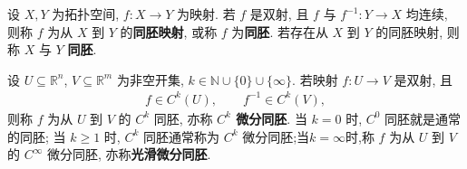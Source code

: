\documentclass[../../main.tex]{subfiles}%
\begin{document}
\begin{definition}[同胚]
设 \(X,Y\) 为拓扑空间, \(f:X\to Y\) 为映射. 若 \(f\) 是双射, 且 \(f\) 与 \(f^{-1}:Y\to X\) 均连续, 则称 \(f\) 为从 \(X\) 到 \(Y\) 的\textbf{同胚映射}, 或称 \(f\) 为\textbf{同胚}. 若存在从 \(X\) 到 \(Y\) 的同胚映射, 则称 \(X\) 与 \(Y\) \textbf{同胚}.
\end{definition}

\begin{definition}[微分同胚]
设 \(U\subseteq\mathbb R^n\), \(V\subseteq\mathbb R^m\) 为非空开集, \(k\in\mathbb N\cup\{0\}\cup\{\infty\}\). 若映射 \(f:U\to V\) 是双射, 且
\begin{align*}
f\in C^k(U),\qquad f^{-1}\in C^k(V),
\end{align*}
则称 \(f\) 为从 \(U\) 到 \(V\) 的 \(C^k\) 同胚, 亦称 \textbf{\(C^k\) 微分同胚}. 当 \(k=0\) 时, \(C^0\) 同胚就是通常的同胚; 当 \(k\geqslant 1\) 时, \(C^k\) 同胚通常称为 \(C^k\) 微分同胚;当$k=\infty$时,称 \(f\) 为从 \(U\) 到 \(V\) 的 \(C^\infty\) 微分同胚, 亦称\textbf{光滑微分同胚}.
\end{definition}
\end{document}

